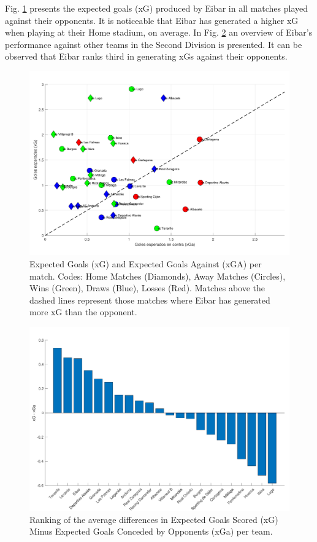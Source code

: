 \documentclass[
  twoside,nohyper]{book}
\begin{document}
Fig. \ref{fig:xg-xga} presents the expected goals (xG) produced by Eibar in all matches played against their opponents. It is noticeable that Eibar has generated a higher xG when playing at their Home stadium, on average. In Fig. \ref{fig:rank-xg-xga} an overview of Eibar's performance against other teams in the Second Division is presented. It can be observed that Eibar ranks third in generating xGs against their opponents.

\begin{figure}[H]

{\centering \includegraphics[width=0.8\linewidth,]{imagenes/scat-xG-xGa} 

}

\caption{Expected Goals (xG) and Expected Goals Against (xGA) per match. Codes: Home Matches (Diamonds), Away Matches (Circles), Wins (Green), Draws (Blue), Losses (Red). Matches above the dashed lines represent those matches where Eibar has generated more xG than the opponent.}\label{fig:xg-xga}
\end{figure}

\begin{figure}[H]

{\centering \includegraphics[width=0.8\linewidth,]{imagenes/xG-xGa} 

}

\caption{Ranking of the average differences in Expected Goals Scored (xG) Minus Expected Goals Conceded by Opponents (xGa) per team.}\label{fig:rank-xg-xga}
\end{figure}
\end{document}
